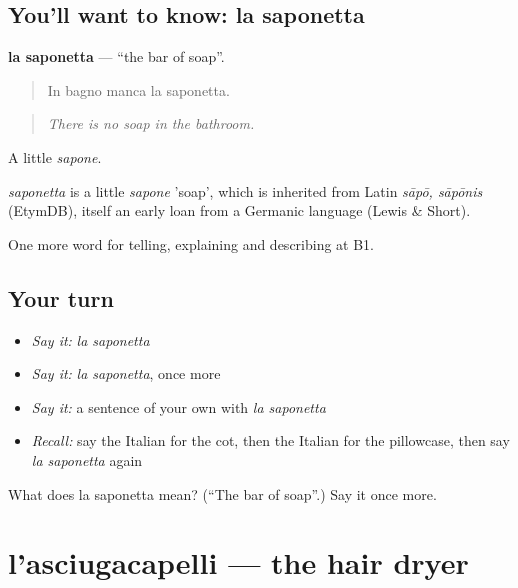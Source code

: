 \subsection*{You'll want to know: la saponetta}
\textbf{la saponetta} — \textquotedblleft{}the bar of soap\textquotedblright{}.

\begin{quote}
In bagno manca la saponetta.
\end{quote}

\begin{quote}
\emph{There is no soap in the bathroom.}
\end{quote}

A little \emph{sapone}.

\begin{cousinweb}
\emph{saponetta} is a little \emph{sapone} 'soap', which is inherited from Latin \emph{sāpō, sāpōnis} (EtymDB), itself an early loan from a Germanic language (Lewis \& Short).
\end{cousinweb}

\begin{grammarlens}[title={What you've built}]
One more word for telling, explaining and describing at B1.
\end{grammarlens}

\subsection*{Your turn}
\begin{itemize}
\raggedright
  \item \emph{Say it:} \emph{la saponetta}
  \item \emph{Say it:} \emph{la saponetta}, once more
  \item \emph{Say it:} a sentence of your own with \emph{la saponetta}
  \item \emph{Recall:} say the Italian for the cot, then the Italian for the pillowcase, then say \emph{la saponetta} again
\end{itemize}

\begin{tcolorbox}[breakable,colback=teal!4,colframe=teal!35!black,title={Before you move on}]
What does la saponetta mean? (\textquotedblleft{}The bar of soap\textquotedblright{}.) Say it once more.
\end{tcolorbox}
\section[l'asciugacapelli]{l'asciugacapelli — the hair dryer}


